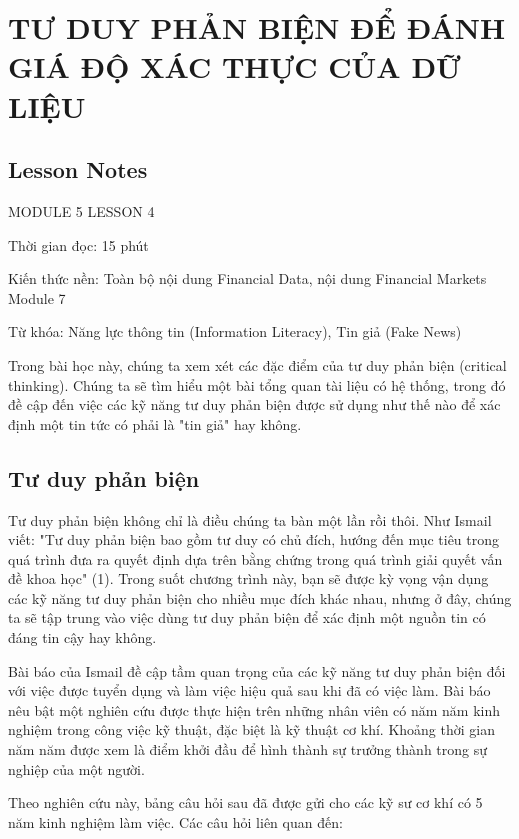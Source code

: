 \chapter{TƯ DUY PHẢN BIỆN ĐỂ ĐÁNH GIÁ ĐỘ XÁC THỰC CỦA DỮ LIỆU}
\label{ch:M5L4LessonNotes}

\section*{Lesson Notes}

MODULE 5 \textbar{} LESSON 4

Thời gian đọc: 15 phút

Kiến thức nền: Toàn bộ nội dung Financial Data, nội dung Financial Markets Module 7

Từ khóa: Năng lực thông tin (Information Literacy), Tin giả (Fake News)

Trong bài học này, chúng ta xem xét các đặc điểm của tư duy phản biện (critical thinking). Chúng ta sẽ tìm hiểu một bài tổng quan tài liệu có hệ thống, trong đó đề cập đến việc các kỹ năng tư duy phản biện được sử dụng như thế nào để xác định một tin tức có phải là "tin giả" hay không.

\section{Tư duy phản biện}

Tư duy phản biện không chỉ là điều chúng ta bàn một lần rồi thôi. Như Ismail viết: "Tư duy phản biện bao gồm tư duy có chủ đích, hướng đến mục tiêu trong quá trình đưa ra quyết định dựa trên bằng chứng trong quá trình giải quyết vấn đề khoa học" (1). Trong suốt chương trình này, bạn sẽ được kỳ vọng vận dụng các kỹ năng tư duy phản biện cho nhiều mục đích khác nhau, nhưng ở đây, chúng ta sẽ tập trung vào việc dùng tư duy phản biện để xác định một nguồn tin có đáng tin cậy hay không.

Bài báo của Ismail đề cập tầm quan trọng của các kỹ năng tư duy phản biện đối với việc được tuyển dụng và làm việc hiệu quả sau khi đã có việc làm. Bài báo nêu bật một nghiên cứu được thực hiện trên những nhân viên có năm năm kinh nghiệm trong công việc kỹ thuật, đặc biệt là kỹ thuật cơ khí. Khoảng thời gian năm năm được xem là điểm khởi đầu để hình thành sự trưởng thành trong sự nghiệp của một người.

Theo nghiên cứu này, bảng câu hỏi sau đã được gửi cho các kỹ sư cơ khí có 5 năm kinh nghiệm làm việc. Các câu hỏi liên quan đến:

